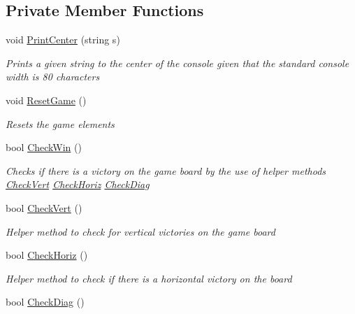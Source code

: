 \subsection*{Private Member Functions}
\begin{DoxyCompactItemize}
\item 
void \hyperlink{class_tic_tac_toe_1_1_tic_tac_toe_abd09f8cb5ea220b735b12777e91b30b8}{Print\+Center} (string s)
\begin{DoxyCompactList}\small\item\em Prints a given string to the center of the console given that the standard console width is 80 characters \end{DoxyCompactList}\item 
void \hyperlink{class_tic_tac_toe_1_1_tic_tac_toe_ad5d26d820ef644351123c87f71197ebd}{Reset\+Game} ()
\begin{DoxyCompactList}\small\item\em Resets the game elements \end{DoxyCompactList}\item 
bool \hyperlink{class_tic_tac_toe_1_1_tic_tac_toe_aaa2941579aad6b8906d56297421f697e}{Check\+Win} ()
\begin{DoxyCompactList}\small\item\em Checks if there is a victory on the game board by the use of helper methods \hyperlink{class_tic_tac_toe_1_1_tic_tac_toe_a5e7ce3305a34fd8f82a15a444890c2f2}{Check\+Vert} \hyperlink{class_tic_tac_toe_1_1_tic_tac_toe_aa75b940e51a60ccb6c9001147cc09fd7}{Check\+Horiz} \hyperlink{class_tic_tac_toe_1_1_tic_tac_toe_a37cb4bd5dff23b5f6d433aa566938c90}{Check\+Diag} \end{DoxyCompactList}\item 
bool \hyperlink{class_tic_tac_toe_1_1_tic_tac_toe_a5e7ce3305a34fd8f82a15a444890c2f2}{Check\+Vert} ()
\begin{DoxyCompactList}\small\item\em Helper method to check for vertical victories on the game board \end{DoxyCompactList}\item 
bool \hyperlink{class_tic_tac_toe_1_1_tic_tac_toe_aa75b940e51a60ccb6c9001147cc09fd7}{Check\+Horiz} ()
\begin{DoxyCompactList}\small\item\em Helper method to check if there is a horizontal victory on the board \end{DoxyCompactList}\item 
bool \hyperlink{class_tic_tac_toe_1_1_tic_tac_toe_a37cb4bd5dff23b5f6d433aa566938c90}{Check\+Diag} ()

\end{DoxyCompactItemize}
